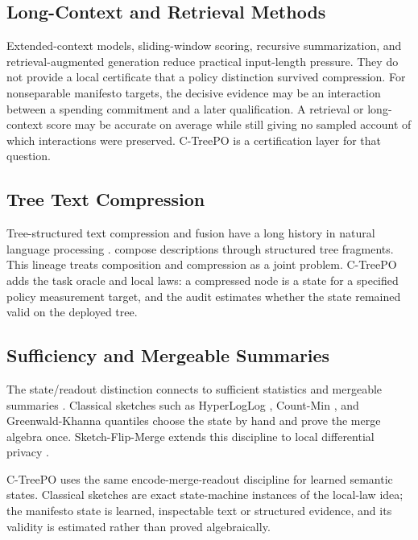 \subsection{Long-Context and Retrieval Methods}

Extended-context models, sliding-window scoring, recursive summarization, and
retrieval-augmented generation reduce practical input-length pressure. They do
not provide a local certificate that a policy distinction survived
compression. For nonseparable manifesto targets, the decisive evidence may be
an interaction between a spending commitment and a later qualification. A
retrieval or long-context score may be accurate on average while still giving
no sampled account of which interactions were preserved. C-TreePO is a
certification layer for that question.

\subsection{Tree Text Compression}

Tree-structured text compression and fusion have a long history in natural
language processing \citep{KnightMarcu2000SentenceCompression,BarzilayMcKeown2005SentenceFusion,ClarkeLapata2008ILPSentenceCompression}.
\citet{KuznetsovaEtAl2014TreeTalk} compose descriptions through structured
tree fragments. This lineage treats composition and compression as a joint
problem. C-TreePO adds the task oracle and local laws: a compressed node is a
state for a specified policy measurement target, and the audit estimates
whether the state remained valid on the deployed tree.

\subsection{Sufficiency and Mergeable Summaries}

The state/readout distinction connects to sufficient statistics
\citep{Fisher1922,Blackwell1953} and mergeable summaries
\citep{Agarwal2013MergeableTODS}. Classical sketches such as HyperLogLog
\citep{FlajoletEtAl2007}, Count-Min \citep{CormodeMuthukrishnan2005}, and
Greenwald-Khanna quantiles \citep{GreenwaldKhanna2001} choose the state by
hand and prove the merge algebra once. Sketch-Flip-Merge extends this
discipline to local differential privacy \citep{HehirTingCormode2023SFM}.

C-TreePO uses the same encode-merge-readout discipline for learned semantic
states. Classical sketches are exact state-machine instances of the local-law
idea; the manifesto state is learned, inspectable text or structured evidence,
and its validity is estimated rather than proved algebraically.

